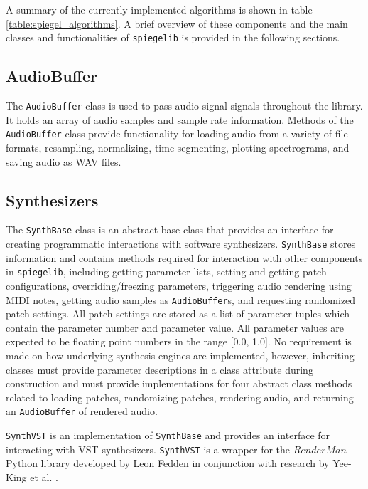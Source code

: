  A summary of the currently implemented algorithms is shown in table \ref{table:spiegel_algorithms}. A brief overview of these components and the main classes and functionalities of \texttt{spiegelib} is provided in the following sections.
 
 
 
\subsection{AudioBuffer}
The \texttt{AudioBuffer} class is used to pass audio signal signals throughout the library. It holds an array of audio samples and sample rate information. Methods of the \texttt{AudioBuffer} class provide functionality for loading audio from a variety of file formats, resampling, normalizing, time segmenting, plotting spectrograms, and saving audio as WAV files.

\subsection{Synthesizers}
The \texttt{SynthBase} class is an abstract base class that provides an interface for creating programmatic interactions with software synthesizers. \texttt{SynthBase} stores information and contains methods required for interaction with other components in \texttt{spiegelib}, including getting parameter lists, setting and getting patch configurations, overriding/freezing parameters, triggering audio rendering using MIDI notes, getting audio samples as \texttt{AudioBuffer}s, and requesting randomized patch settings. All patch settings are stored as a list of parameter tuples which contain the parameter number and parameter value. All parameter values are expected to be floating point numbers in the range [0.0, 1.0]. No requirement is made on how underlying synthesis engines are implemented, however, inheriting classes must provide parameter descriptions in a class attribute during construction and must provide implementations for four abstract class methods related to loading patches, randomizing patches, rendering audio, and returning an \texttt{AudioBuffer} of rendered audio.

%

\texttt{SynthVST} is an implementation of \texttt{SynthBase} and provides an interface for interacting with VST synthesizers. \texttt{SynthVST} is a wrapper for the $RenderMan$ Python library developed by Leon Fedden in conjunction with research by Yee-King et al. \cite{yee2018automatic}.

